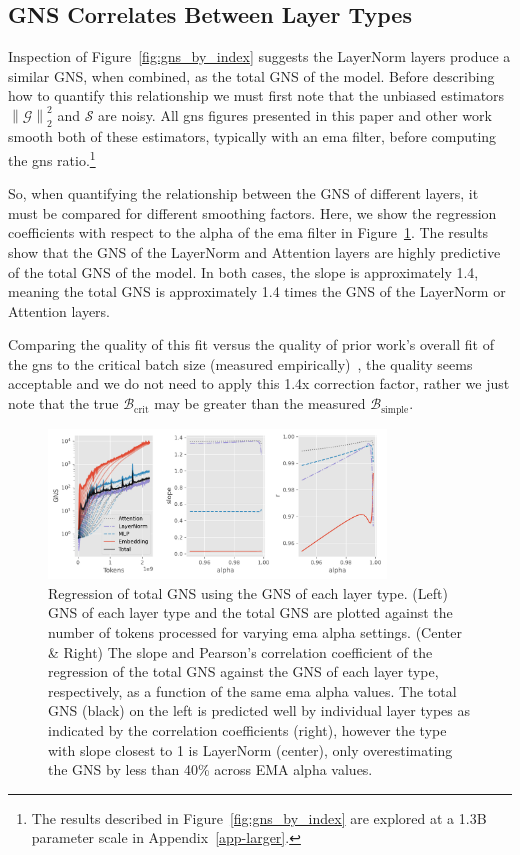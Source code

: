 \documentclass{article}
\newcommand{\Bcrit}{\mathcal{B}_{\textrm{crit}}}
\newcommand{\Bsimple}{\mathcal{B}_{\textrm{simple}}}
\newcommand{\sqn}[1]{\left\lVert#1\right\rVert_2^2}
\begin{document}
\subsection{GNS Correlates Between Layer Types}\label{correlation}

Inspection of Figure~\ref{fig:gns_by_index} suggests the LayerNorm layers
produce a similar GNS, when combined, as the total GNS of the model. Before
describing how to quantify this relationship we must first note that the
unbiased estimators $\sqn{\mathcal{G}}$ and $\mathcal{S}$ are noisy. All \ac{gns}
figures presented in this paper and other work smooth both of these estimators,
typically with an \ac{ema} filter, before computing the \ac{gns}
ratio.\footnote{The results described in Figure~\ref{fig:gns_by_index} are
    explored at a 1.3B parameter scale in Appendix~\ref{app-larger}.}

So, when quantifying the relationship between the GNS of different layers, it
must be compared for different smoothing factors. Here, we show the regression
coefficients with respect to the alpha of the \ac{ema} filter in
Figure~\ref{fig:regress_gns}. The results show that the GNS of the LayerNorm
and Attention layers are highly predictive of the total GNS of the model.
In both cases, the slope is approximately 1.4, meaning the total GNS is
approximately 1.4 times the GNS of the LayerNorm or Attention layers.

Comparing the quality of this fit versus the quality of prior work's overall fit of the \ac{gns} to the critical batch size
(measured empirically)~\citep{mccandlish2018empirical}, the quality seems acceptable and
we do not need to apply this 1.4x correction factor, rather we just note that the true
$\Bcrit$ may be greater than the measured $\Bsimple$.

\begin{figure}
    \centering
    \includegraphics[width=0.8\textwidth]{owt_figures/regress_gns.pdf}
    \caption{%
        Regression of total GNS using the GNS of each layer type. (Left) GNS of
        each layer type and the total GNS are plotted against the number of
        tokens processed for varying \ac{ema} alpha settings. (Center \& Right)
        The slope and Pearson's correlation coefficient of the regression of the
        total GNS against the GNS of each layer type, respectively, as
        a function of the same \ac{ema} alpha values. The total GNS (black) on
        the left is predicted well by individual layer types as indicated by the
        correlation coefficients (right), however the type with slope closest to
        1 is LayerNorm (center), only overestimating the GNS by less than 40\%
        across EMA alpha values.}
    \label{fig:regress_gns}
\end{figure}
\end{document}
